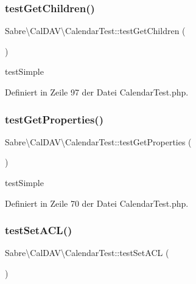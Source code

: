 \subsubsection{\texorpdfstring{test\+Get\+Children()}{testGetChildren()}}
{\footnotesize\ttfamily Sabre\textbackslash{}\+Cal\+D\+A\+V\textbackslash{}\+Calendar\+Test\+::test\+Get\+Children (\begin{DoxyParamCaption}{ }\end{DoxyParamCaption})}

test\+Simple 

Definiert in Zeile 97 der Datei Calendar\+Test.\+php.

\mbox{\label{class_sabre_1_1_cal_d_a_v_1_1_calendar_test_af573009eec342349304b8e381eb20567}} 
\subsubsection{\texorpdfstring{test\+Get\+Properties()}{testGetProperties()}}
{\footnotesize\ttfamily Sabre\textbackslash{}\+Cal\+D\+A\+V\textbackslash{}\+Calendar\+Test\+::test\+Get\+Properties (\begin{DoxyParamCaption}{ }\end{DoxyParamCaption})}

test\+Simple 

Definiert in Zeile 70 der Datei Calendar\+Test.\+php.

\mbox{\label{class_sabre_1_1_cal_d_a_v_1_1_calendar_test_a9236b3deae90ff92a30c1e4e456a5c03}} 
\subsubsection{\texorpdfstring{test\+Set\+A\+C\+L()}{testSetACL()}}
{\footnotesize\ttfamily Sabre\textbackslash{}\+Cal\+D\+A\+V\textbackslash{}\+Calendar\+Test\+::test\+Set\+A\+CL (\begin{DoxyParamCaption}{ }\end{DoxyParamCaption})}



